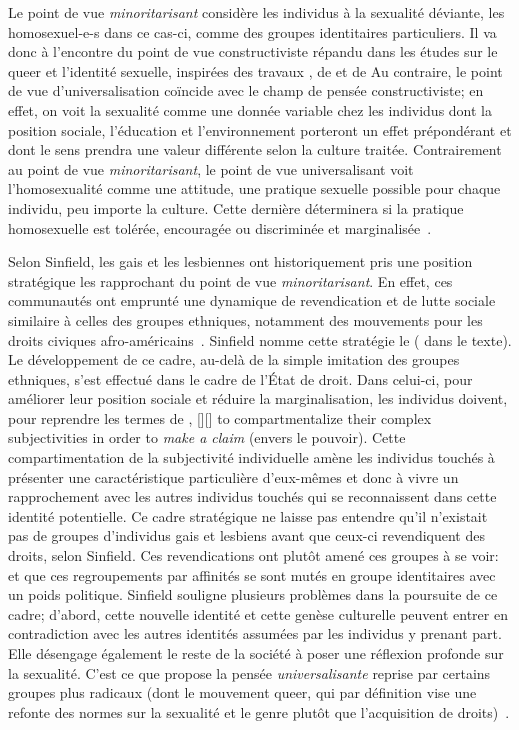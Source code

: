 Le point de vue \emph{minoritarisant} considère les individus à la sexualité déviante, les homosexuel-e-s dans ce cas-ci, comme des groupes identitaires particuliers.
Il va donc à l'encontre du point de vue constructiviste répandu dans les études sur le queer et l'identité sexuelle, inspirées des travaux \citet{Foucault2011}, de \citet{Rubin2010} et de \citet{Butler2007}
Au contraire, le point de vue d'universalisation coïncide avec le champ de pensée constructiviste; en effet, on voit la sexualité comme une donnée variable chez les individus dont la position sociale, l'éducation et l'environnement porteront un effet prépondérant et dont le sens prendra une valeur différente selon la culture traitée.
Contrairement au point de vue \emph{minoritarisant}, le point de vue universalisant voit l'homosexualité comme une attitude, une pratique sexuelle possible pour chaque individu, peu importe la culture.
Cette dernière déterminera si la pratique homosexuelle est tolérée, encouragée ou discriminée et marginalisée~\citep[271]{Sinfield1996}.

Selon Sinfield, les gais et les lesbiennes ont historiquement pris une position stratégique les rapprochant du point de vue \emph{minoritarisant}.
En effet, ces communautés ont emprunté une dynamique de revendication et de lutte sociale similaire à celles des groupes ethniques, notamment des mouvements pour les droits civiques afro-américains~\citep[271]{Sinfield1996}.
Sinfield nomme cette stratégie le  ( dans le texte).
Le développement de ce cadre, au-delà de la simple imitation des groupes ethniques, s'est effectué dans le cadre de l'État de droit.
Dans celui-ci, pour améliorer leur position sociale et réduire la marginalisation, les individus doivent, pour reprendre les termes de \citet{Sinfield1996}, [{\citeyear[272]{Sinfield1996}}][]{\textelp{} to   compartmentalize their complex subjectivities in order to \emph{make a claim} (envers le pouvoir)}.
Cette compartimentation de la subjectivité individuelle amène les individus touchés à présenter une caractéristique particulière d'eux-mêmes et donc à vivre un rapprochement avec les autres individus touchés qui se reconnaissent dans cette identité potentielle.
Ce cadre stratégique ne laisse pas entendre qu'il n'existait pas de groupes d'individus gais et lesbiens avant que ceux-ci revendiquent des droits, selon Sinfield.
Ces revendications ont plutôt amené ces groupes à se voir:  ~\citep[272]{Sinfield1996} et que ces regroupements par affinités se sont mutés en groupe identitaires avec un poids politique.
Sinfield souligne plusieurs problèmes dans la poursuite de ce cadre; d'abord, cette nouvelle identité et cette genèse culturelle peuvent entrer en contradiction avec les autres identités assumées par les individus y prenant part.
Elle désengage également le reste de la société à poser une réflexion profonde sur la sexualité.
C'est ce que propose la pensée \emph{universalisante} reprise par certains groupes plus radicaux (dont le mouvement queer, qui par définition vise une refonte des normes sur la sexualité et le genre plutôt que l'acquisition de droits)~\citep[273]{Sinfield1996}.

